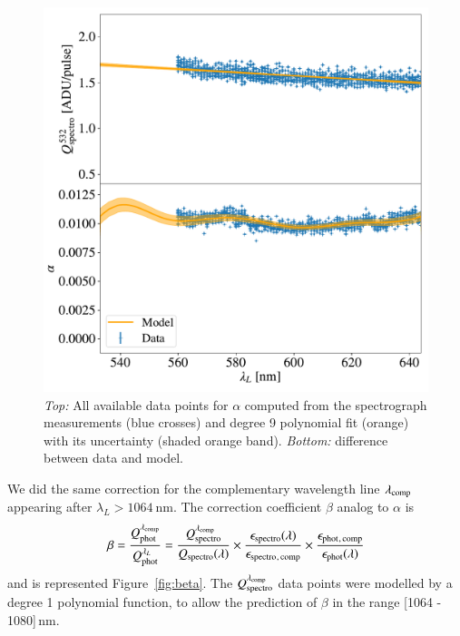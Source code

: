 \begin{figure}[h]
    \centering
    \includegraphics[width=\columnwidth]{fig/alpha_532_qswMAX.pdf}
    \caption{\textit{Top:} All available data points for $\alpha$ computed from the spectrograph measurements (blue crosses) and degree 9 polynomial fit (orange) with its uncertainty (shaded orange band). \textit{Bottom:} difference between data and model.}
    \label{fig:alpha_532}
\end{figure}


We did the same correction for the complementary wavelength line $\lambda_{\rm comp}$ appearing after $\lambda_L > \SI{1064}{\nm}$. The correction coefficient $\beta$ analog to $\alpha$ is
\begin{equation}
    \beta = \frac{Q_{\mathrm{phot}}^{\lambda_{\rm comp}}}{Q_{\mathrm{phot}}^{\lambda_L}} = \frac{Q_{\mathrm{spectro}}^{\lambda_{\rm comp}}}{Q_{\mathrm{spectro}}(\lambda)} \times \frac{\epsilon_{\mathrm{spectro}}(\lambda)}{\epsilon_{\mathrm{spectro}}{}_{\mathrm{, \, comp}}} \times \frac{\epsilon_{\mathrm{phot}}{}_{\mathrm{, \, comp}}}{\epsilon_{\mathrm{phot}}(\lambda)}  
    \label{eq:beta}
\end{equation}
and is represented Figure~\ref{fig:beta}. The $Q_{\mathrm{spectro}}^{\lambda_{\rm comp}}$ data points were modelled by a degree 1 polynomial function, to allow the prediction of $\beta$ in the range [1064 - 1080]\,nm.

